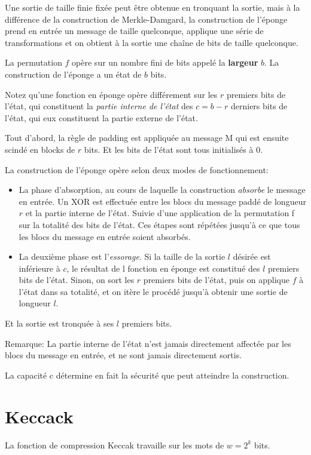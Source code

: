 \documentclass[10.5pt, a4paper, twoside, openright]{report}
\begin{document}
Une sortie de taille finie fixée peut être obtenue en tronquant la sortie, mais à la différence de la construction de Merkle-Damgard, la construction de l'éponge prend en entrée un message de taille quelconque, applique une série de transformations et on obtient à la sortie une chaîne de bits de taille quelconque.

La permutation $f$ opère sur un nombre fini de bits appelé la \textbf{largeur} $b$. La construction de l'éponge a un état de $b$ bits.

Notez qu'une fonction en éponge opère différement sur les $r$ premiers bits de l'état, qui constituent la \emph{partie interne de l'état} des $c=b-r$ derniers bits de l'état, qui eux constituent la partie externe de l'état.

Tout d'abord, la règle de padding est appliquée au message M qui est ensuite scindé en blocks de $r$ bits.
Et les bits de l'état sont tous initialisés à 0. 

La construction de l'éponge opère selon deux modes de fonctionnement:
\begin{itemize}
\item{La phase d'absorption, au cours de laquelle la construction \emph{absorbe} le message en entrée. 
Un XOR est effectuée entre les blocs du message paddé de longueur $r$ et la partie interne de l'état. Suivie d'une application de la permutation f sur la totalité des bits de l'état.
Ces étapes sont répétées jusqu'à ce que tous les blocs du message en entrée soient absorbés.}

\item{La deuxième phase est l'\emph{essorage}. Si la taille de la sortie $l$ désirée est inférieure à $c$, le résultat de l fonction en éponge est constitué des $l$ premiers bits de l'état. Sinon, on sort les $r$ premiers bits de l'état, puis on applique $f$ à l'état dans sa totalité, et on itère le procédé jusqu'à obtenir une sortie de longueur $l$.}
\end{itemize} 
Et la sortie est tronquée à ses $l$ premiers bits.

Remarque: La partie interne de l'état n'est jamais directement affectée par les blocs du message en entrée, et ne sont jamais directement sortis.

La capacité c détermine en fait la sécurité que peut atteindre la construction. 


\section{Keccack}
La fonction de compression Keccak travaille sur les mots de $w=2^k$ bits.
\end{document}
